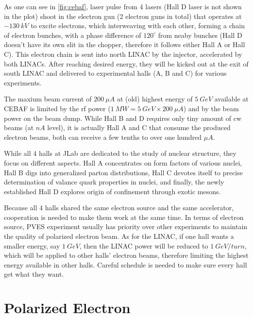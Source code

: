 As one can see in \ref{fig:cebaf}, laser pulse from 4 lasers (Hall D laser is not
shown in the plot) shoot in the electron gun (2 electron guns in total) that 
operates at $-130\ kV$ to excite electrons, which interweaving with each other, 
forming a chain of electron bunches, with a phase difference of $120^\circ$ from 
neaby bunches (Hall D doesn't have its own slit in the chopper, therefore 
it follows either Hall A or Hall C). This electron chain is sent into north LINAC
by the injector, accelerated by both LINACs. After reaching desired energy,
they will be kicked out at the exit of south LINAC and delivered to experimental
halls (A, B and C) for various experiments. 

The maxium beam current of $200\ \mu A$ at (old) highest energy of $5\ GeV$ 
available at CEBAF is limited by the rf power ($1\ MW = 5\ GeV \times 200\ \mu A$) 
and by the beam power on the beam dump. While Hall B and D requires only tiny 
amount of cw beams (at $nA$ level), it is actually Hall A and C that consume 
the produced electron beams, both can receive a few tenths to over one 
hundred $\mu A$.

While all 4 halls at JLab are dedicated to the study of nuclear structure, they
focus on different aspects. Hall A concentrates on form factors of various nuclei, 
Hall B digs into generalized parton distributions, Hall C devotes itself to precise
determination of valance quark properties in nuclei, and finally, the newly 
established Hall D explores origin of confinement through exotic mesons.

Because all 4 halls shared the same electron source and the same accelerator, 
cooperation is needed to make them work at the same time. In terms of electron
source, PVES experiment usually has priority over other experiments to maintain 
the quality of polarized electron beam. As for the LINAC, if one hall wants
a smaller energy, say $1\ GeV$, then the LINAC power will be reduced to $1\ GeV/turn$,
which will be applied to other halls' electron beams, therefore limiting the 
highest energy available in other halls. Careful schedule is needed to make sure
every hall get what they want.
\section{Polarized Electron}

